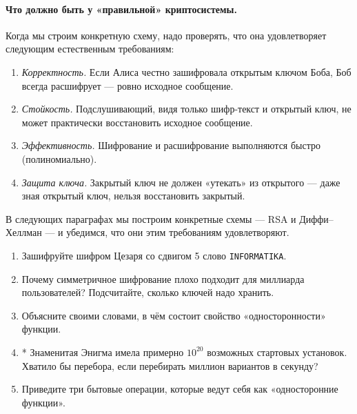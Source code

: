 \paragraph*{Что должно быть у «правильной» криптосистемы.} Когда мы строим конкретную схему, надо проверять, что она удовлетворяет следующим естественным требованиям:
\begin{enumerate}
  \item \emph{Корректность.} Если Алиса честно зашифровала открытым ключом Боба, Боб всегда расшифрует --- ровно исходное сообщение.
  \item \emph{Стойкость.} Подслушивающий, видя только шифр-текст и открытый ключ, не может практически восстановить исходное сообщение.
  \item \emph{Эффективность.} Шифрование и расшифрование выполняются быстро (полиномиально).
  \item \emph{Защита ключа.} Закрытый ключ не должен «утекать» из открытого --- даже зная открытый ключ, нельзя восстановить закрытый.
\end{enumerate}

В следующих параграфах мы построим конкретные схемы --- RSA и Диффи--Хеллман --- и убедимся, что они этим требованиям удовлетворяют.

\begin{tasksbox}
\begin{enumerate}
  \item Зашифруйте шифром Цезаря со сдвигом 5 слово \texttt{INFORMATIKA}.
  \item Почему симметричное шифрование плохо подходит для миллиарда пользователей? Подсчитайте, сколько ключей надо хранить.
  \item Объясните своими словами, в чём состоит свойство «односторонности» функции.
  \item* Знаменитая Энигма имела примерно $10^{20}$ возможных стартовых установок. Хватило бы перебора, если перебирать миллион вариантов в секунду?
  \item Приведите три бытовые операции, которые ведут себя как «односторонние функции».
\end{enumerate}
\end{tasksbox}

